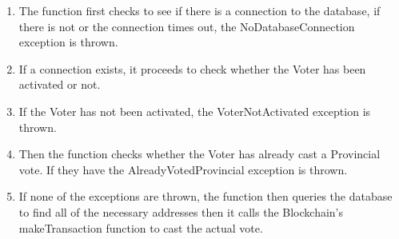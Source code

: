 \begin{enumerate}
\begin{enumerate}
		\begin{enumerate}
			\item The function first checks to see if there is a connection to the database, if there is not or the connection times out, the NoDatabaseConnection exception is thrown. 
			\item If a connection exists, it proceeds to check whether the Voter has been activated or not. 
			\item If the Voter has not been activated, the VoterNotActivated exception is thrown. 
			\item Then the function checks whether the Voter has already cast a Provincial vote. If they have the AlreadyVotedProvincial exception is thrown.
			\item If none of the exceptions are thrown, the function then queries the database to find all of the necessary addresses then it calls the Blockchain's makeTransaction function to cast the actual vote.  
			
		\end{enumerate}
	\end{enumerate}
\end{enumerate}









